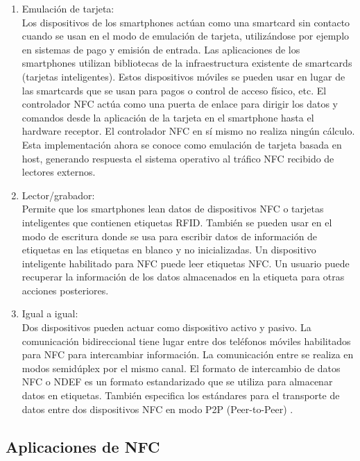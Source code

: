 \documentclass[12pt,a4paper,onecolumn,oneside]{report}
\begin{document}
\begin{enumerate}

\item Emulación de tarjeta:\\
Los dispositivos de los smartphones actúan como una smartcard sin contacto cuando se usan en el modo de emulación de tarjeta,  utilizándose por ejemplo en sistemas de pago y emisión de entrada. Las aplicaciones de los smartphones utilizan bibliotecas de la infraestructura existente de smartcards (tarjetas inteligentes). Estos dispositivos móviles se pueden usar en lugar de las smartcards que se usan para pagos o control de acceso físico, etc. El controlador NFC actúa como una puerta de enlace para dirigir los datos y comandos desde la aplicación de la tarjeta en el smartphone hasta el hardware receptor. El controlador NFC en sí mismo no realiza ningún cálculo. Esta implementación ahora se conoce como emulación de tarjeta basada en host, generando respuesta el sistema operativo al tráfico NFC recibido de lectores externos.

\item Lector/grabador:\\
Permite que los smartphones lean datos de dispositivos NFC o tarjetas inteligentes que contienen etiquetas RFID. También se pueden usar en el modo de escritura donde se usa para escribir datos de información de etiquetas en las etiquetas en blanco y no inicializadas. Un dispositivo inteligente habilitado para NFC puede leer etiquetas NFC. Un usuario puede recuperar la información de los datos almacenados en la etiqueta para otras acciones posteriores.

\item Igual a igual:\\
Dos dispositivos pueden actuar como dispositivo activo y pasivo. La comunicación bidireccional tiene lugar entre dos teléfonos móviles habilitados para NFC para intercambiar información. La comunicación entre se realiza en modos semidúplex por el mismo canal. El formato de intercambio de datos NFC o NDEF \cite{cinco} es un formato estandarizado que se utiliza para almacenar datos en etiquetas. También especifica los estándares para el transporte de datos entre dos dispositivos NFC en modo P2P (Peer-to-Peer) \cite{seis}. 

\end{enumerate}

\subsection{Aplicaciones de NFC}
\end{document}

